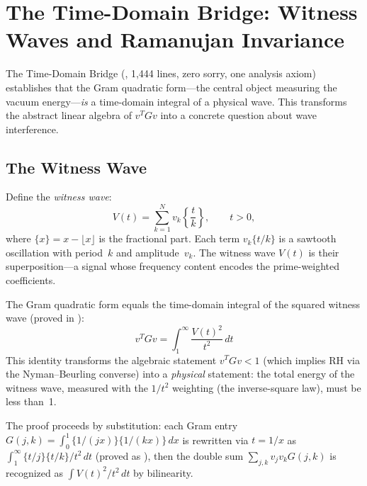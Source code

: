 \section{The Time-Domain Bridge: Witness Waves and Ramanujan Invariance}
\label{sec:time-domain}

The Time-Domain Bridge (,
1,444 lines, zero sorry, one analysis axiom) establishes that the Gram
quadratic form---the central object measuring the vacuum energy---\emph{is}
a time-domain integral of a physical wave. This transforms the abstract
linear algebra of $v^T G v$ into a concrete question about wave interference.

\subsection{The Witness Wave}

Define the \emph{witness wave}:
\begin{equation}
  V(t) = \sum_{k=1}^{N} v_k \left\{\frac{t}{k}\right\},
  \qquad t > 0,
  \label{eq:witness-wave}
\end{equation}
where $\{x\} = x - \lfloor x \rfloor$ is the fractional part. Each
term $v_k \{t/k\}$ is a sawtooth oscillation with period~$k$ and
amplitude~$v_k$. The witness wave $V(t)$ is their superposition---a
signal whose frequency content encodes the prime-weighted coefficients.

\begin{principle}
The Gram quadratic form equals the time-domain integral of the squared
witness wave (proved in ):
\begin{equation}
  v^T G v = \int_1^{\infty} \frac{V(t)^2}{t^2}\,dt
  \label{eq:quad-form-td}
\end{equation}
This identity transforms the algebraic statement $v^T G v < 1$
(which implies RH via the Nyman--Beurling converse) into a
\emph{physical} statement: the total energy of the witness wave,
measured with the $1/t^2$ weighting (the inverse-square law), must be
less than~1.
\end{principle}

The proof proceeds by substitution: each Gram entry $G(j,k) =
\int_0^1 \{1/(jx)\}\{1/(kx)\}\,dx$ is rewritten via $t = 1/x$ as
$\int_1^\infty \{t/j\}\{t/k\}/t^2\,dt$ (proved as
), then the double sum $\sum_{j,k} v_j v_k
G(j,k)$ is recognized as $\int V(t)^2/t^2\,dt$ by bilinearity.

